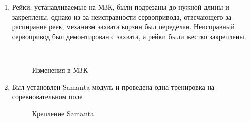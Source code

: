 \begin{enumerate}
	\item Рейки, устанавливаемые на МЗК, были подрезаны до нужной длины и закреплены, однако из-за неисправности сервопривода, отвечающего за распирание реек, механизм захвата корзин был переделан. Неисправный сервопривод был демонтирован с захвата, а рейки были жестко закреплены.
	
	\begin{figure}[H]
		\begin{minipage}[h]{0.2\linewidth}
			\center  
		\end{minipage}
		\begin{minipage}[h]{0.6\linewidth}
			\caption{Изменения в МЗК}
		\end{minipage}
	\end{figure}
	
	\item Был установлен Samanta-модуль и проведена одна тренировка на соревновательном поле.
	
	\begin{figure}[H]
		\begin{minipage}[h]{1\linewidth}
		\end{minipage}
		\caption{Крепление Samanta}
	\end{figure}
	 	
\end{enumerate}
\fillpage